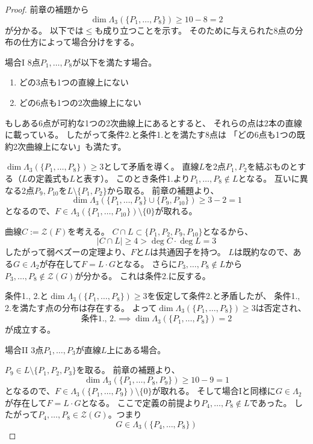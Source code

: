 \documentclass[a4]{article}
\begin{document}
        \begin{proof}
            前章の補題から\[ \dim\Lambda_3(\{P_1, \dots, P_8 \}) \geq 10-8=2 \]が分かる。
            以下では$\leq$も成り立つことを示す。
            そのために与えられた8点の分布の仕方によって場合分けをする。

            \begin{itembox}[l]{場合I}
                8点$P_1, \dots, P_8$が以下を満たす場合。
                \begin{enumerate}
                    \item どの3点も1つの直線上にない
                    \item どの6点も1つの2次曲線上にない
                \end{enumerate}
            \end{itembox}
            もしある6点が可約な1つの2次曲線上にあるとすると、
            それらの点は2本の直線に載っている。
            したがって条件2.と条件1.とを満たす8点は
            「どの6点も1つの既約2次曲線上にない」も満たす。

            $\dim\Lambda_3(\{P_1, \dots, P_8 \}) \geq 3$として矛盾を導く。
            直線$L$を2点$P_1, P_2$を結ぶものとする（$L$の定義式も$L$と表す）。
            このとき条件1.より$P_1, \dots, P_8 \not \in L$となる。
            互いに異なる2点$P_{9}, P_{10}$を$L \setminus \{P_1, P_2\}$から取る。
            前章の補題より、
            \[ \dim \Lambda_3(\{P_1, \dots, P_8\} \cup \{ P_9, P_{10} \}) \geq 3-2=1 \]
            となるので、$F \in \Lambda_3(\{P_1, \dots, P_{10} \}) \setminus \{0\}$が取れる。

            曲線$C:=\mathcal{Z}(F)$を考える。
            $C \cap L \subset \{P_1, P_2, P_9, P_{10}\}$となるから、
            \[ |C \cap L| \geq 4 > \deg C \cdot \deg L=3 \]
            したがって弱ベズーの定理より、$F$と$L$は共通因子を持つ。
            $L$は既約なので、ある$G \in \Lambda_2$が存在して$F=L \cdot G$となる。
            さらに$P_3, \dots, P_8 \not \in L$から$P_3, \dots, P_8 \not \in \mathcal{Z}(G)$が分かる。
            これは条件2.に反する。

            条件1., 2.と$\dim \Lambda_3(\{P_1, \dots, P_8 \}) \geq 3$を仮定して条件2.と矛盾したが、
            条件1., 2.を満たす点の分布は存在する。
            よって$\dim \Lambda_3(\{P_1, \dots, P_8 \}) \geq 3$は否定され、
            \[ \mbox{条件1., 2.} \implies \dim\Lambda_3(\{P_1, \dots, P_8 \})=2 \]
            が成立する。

            \begin{itembox}[l]{場合II}
                3点$P_1, \dots, P_3$が直線$L$上にある場合。
            \end{itembox}
            $P_9 \in L \setminus \{P_1, P_2, P_3\}$を取る。
            前章の補題より、
            \[ \dim \Lambda_3(\{P_1, \dots, P_8, P_9 \}) \geq 10-9=1 \]
            となるので、$F \in \Lambda_3(\{P_1, \dots, P_9 \}) \setminus \{0\}$が取れる。
            そして場合Iと同様に$G \in \Lambda_2$が存在して$F=L \cdot G$となる。
            ここで定義の前提より$P_4, \dots, P_8 \not \in L$であった。
            したがって$P_4, \dots, P_8 \in \mathcal{Z}(G)$。つまり
            \[ G \in \Lambda_3(\{P_4, \dots, P_8 \}) \]


\end{proof}
\end{document}
